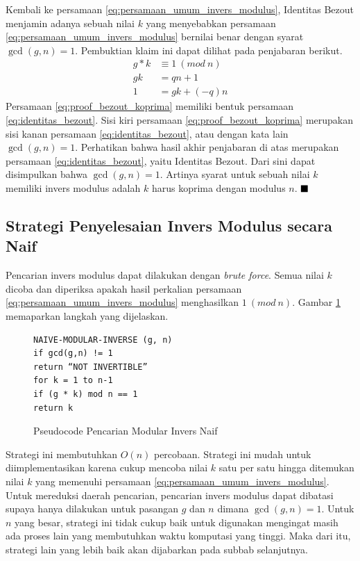 Kembali ke persamaan \eqref{eq:persamaan_umum_invers_modulus}, Identitas Bezout menjamin adanya sebuah nilai $ k $ yang menyebabkan persamaan \eqref{eq:persamaan_umum_invers_modulus} bernilai benar dengan syarat $ \gcd (g,n) = 1 $. Pembuktian klaim ini dapat dilihat pada penjabaran berikut.
\begin{align}
g*k &\equiv 1\ (mod\ n) \\
gk &= qn+1 \\
1 &= gk + (-q)n
\label{eq:proof_bezout_koprima}
\end{align}
Persamaan \eqref{eq:proof_bezout_koprima} memiliki bentuk persamaan \eqref{eq:identitas_bezout}. Sisi kiri persamaan \eqref{eq:proof_bezout_koprima} merupakan sisi kanan persamaan \eqref{eq:identitas_bezout}, atau dengan kata lain $ \gcd (g, n) = 1 $. Perhatikan bahwa hasil akhir penjabaran di atas merupakan persamaan \eqref{eq:identitas_bezout}, yaitu Identitas Bezout. Dari sini dapat disimpulkan bahwa $ \gcd (g, n)=1 $. Artinya syarat untuk sebuah nilai $ k $ memiliki invers modulus adalah $ k $ harus koprima dengan modulus $ n $. \hfill $ \blacksquare $

\subsection{Strategi Penyelesaian Invers Modulus secara Naif}

Pencarian invers modulus dapat dilakukan dengan \textit{brute force}. Semua nilai $ k $ dicoba dan diperiksa apakah hasil perkalian persamaan \eqref{eq:persamaan_umum_invers_modulus} menghasilkan $ 1\ (mod\ n) $. Gambar \ref{psdo:modinv_naive} memaparkan langkah yang dijelaskan.
\begin{figure}[h!]
\begin{lstlisting}[firstnumber=0]
NAIVE-MODULAR-INVERSE (g, n)
if gcd(g,n) != 1
return “NOT INVERTIBLE”
for k = 1 to n-1
if (g * k) mod n == 1
return k
\end{lstlisting}
\caption{Pseudocode Pencarian Modular Invers Naif}
\label{psdo:modinv_naive}
\end{figure}

Strategi ini membutuhkan $ O(n) $ percobaan. Strategi ini mudah untuk diimplementasikan karena cukup mencoba nilai $ k $ satu per satu hingga ditemukan nilai $ k $ yang memenuhi persamaan \eqref{eq:persamaan_umum_invers_modulus}. Untuk mereduksi daerah pencarian, pencarian invers modulus dapat dibatasi supaya hanya dilakukan untuk pasangan $g$ dan $n$ dimana $ \gcd⁡(g,n)=1$. Untuk $ n $ yang besar, strategi ini tidak cukup baik untuk digunakan mengingat masih ada proses lain yang membutuhkan waktu komputasi yang tinggi. Maka dari itu, strategi lain yang lebih baik akan dijabarkan pada subbab selanjutnya.

